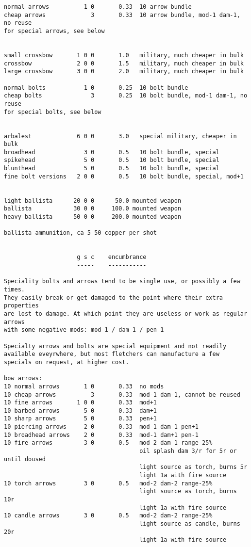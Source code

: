 \begin{verbatim}
normal arrows          1 0       0.33  10 arrow bundle
cheap arrows             3       0.33  10 arrow bundle, mod-1 dam-1, no reuse
for special arrows, see below


small crossbow       1 0 0       1.0   military, much cheaper in bulk
crossbow             2 0 0       1.5   military, much cheaper in bulk
large crossbow       3 0 0       2.0   military, much cheaper in bulk

normal bolts           1 0       0.25  10 bolt bundle
cheap bolts              3       0.25  10 bolt bundle, mod-1 dam-1, no reuse
for special bolts, see below


arbalest             6 0 0       3.0   special military, cheaper in bulk
broadhead              3 0       0.5   10 bolt bundle, special
spikehead              5 0       0.5   10 bolt bundle, special
blunthead              5 0       0.5   10 bolt bundle, special
fine bolt versions   2 0 0       0.5   10 bolt bundle, special, mod+1


light ballista      20 0 0      50.0 mounted weapon
ballista            30 0 0     100.0 mounted weapon
heavy ballista      50 0 0     200.0 mounted weapon

ballista ammunition, ca 5-50 copper per shot


                     g s c    encumbrance
                     -----    -----------

Speciality bolts and arrows tend to be single use, or possibly a few times.
They easily break or get damaged to the point where their extra properties
are lost to damage. At which point they are useless or work as regular arrows
with some negative mods: mod-1 / dam-1 / pen-1

Specialty arrows and bolts are special equipment and not readily available eveyrwhere, but most fletchers can manufacture a few specials on request, at higher cost.

bow arrows:
10 normal arrows       1 0       0.33  no mods
10 cheap arrows          3       0.33  mod-1 dam-1, cannot be reused
10 fine arrows       1 0 0       0.33  mod+1
10 barbed arrows       5 0       0.33  dam+1
10 sharp arrows        5 0       0.33  pen+1
10 piercing arrows     2 0       0.33  mod-1 dam-1 pen+1
10 broadhead arrows    2 0       0.33  mod-1 dam+1 pen-1
10 fire arrows         3 0       0.5   mod-2 dam-1 range-25%
                                       oil splash dam 3/r for 5r or until doused
                                       light source as torch, burns 5r
                                       light 1a with fire source
10 torch arrows        3 0       0.5   mod-2 dam-2 range-25%
                                       light source as torch, burns 10r
                                       light 1a with fire source
10 candle arrows       3 0       0.5   mod-2 dam-2 range-25%
                                       light source as candle, burns 20r
                                       light 1a with fire source


\end{verbatim}
